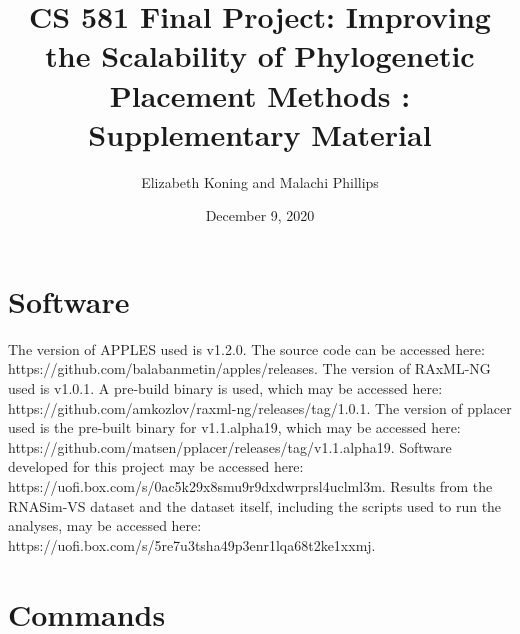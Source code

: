 \documentclass[10pt]{article}
\title{CS 581 Final Project: Improving the Scalability of Phylogenetic Placement Methods : Supplementary Material}
\author{Elizabeth Koning and Malachi Phillips}
\date{December 9, 2020}
\begin{document}
\maketitle

\section{Software}
The version of APPLES used is v1.2.0. The source code can be accessed here:\newline
https://github.com/balabanmetin/apples/releases.\newline
The version of RAxML-NG used is v1.0.1. A pre-build binary is used, which may be accessed here:\newline
https://github.com/amkozlov/raxml-ng/releases/tag/1.0.1.\newline
The version of pplacer used is the pre-built binary for v1.1.alpha19, which may be accessed here:\newline
https://github.com/matsen/pplacer/releases/tag/v1.1.alpha19.
Software developed for this project may be accessed here:\newline
https://uofi.box.com/s/0ac5k29x8smu9r9dxdwrprsl4uclml3m.
Results from the RNASim-VS dataset and the dataset itself, including
the scripts used to run the analyses, may be accessed here:\newline
https://uofi.box.com/s/5re7u3tsha49p3enr1lqa68t2ke1xxmj.

\section{Commands}
\end{document}
